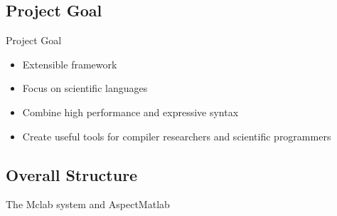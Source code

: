 \subsection{Project Goal}
\begin{frame}{Project Goal}
  \begin{itemize}
  \item Extensible framework
  \item Focus on scientific languages
  \item Combine high performance and expressive syntax
  \item Create useful tools for compiler researchers and scientific
    programmers
  \end{itemize}
\end{frame}

\subsection{Overall Structure}
\begin{frame}{The Mclab system and AspectMatlab}
  \begin{center}
  \end{center}

\end{frame}
